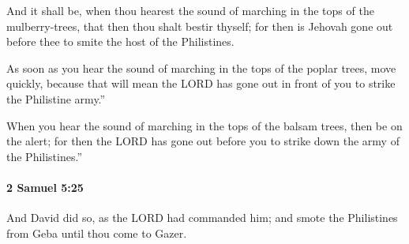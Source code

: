 			\begin{versebox}
					\item[BHS] 
					\item[ASV] And it shall be, when thou hearest the sound of marching in the tops of the mulberry-trees, that then thou shalt bestir thyself; for then is Jehovah gone out before thee to smite the host of the Philistines.
					\item[NIV] As soon as you hear the sound of marching in the tops of the poplar trees, move quickly, because that will mean the LORD has gone out in front of you to strike the Philistine army.”
					\item[NRSV] When you hear the sound of marching in the tops of the balsam trees, then be on the alert; for then the LORD has gone out before you to strike down the army of the Philistines.”
			\end{versebox}

		\paragraph{2 Samuel 5:25} %
			\label{2SAMUEL-5-25}

			And David did so, as the LORD had commanded him; and smote the Philistines from Geba until thou come to Gazer.

